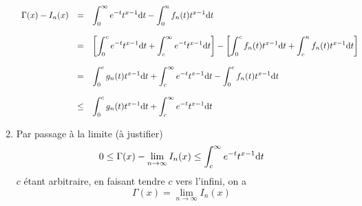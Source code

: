 \documentclass{article}
\def \de {{\rm d}}
\begin{document}
\begin{enumerate}
\[\begin{array}{rcl}
\Gamma(x) - I_n(x)&=&\displaystyle \int_0^\infty e^{-t}t^{x-1}\de t -\int_0^n f_n(t)t^{x-1}\de t\\  \\
&=&\displaystyle \left[ \int_0^c e^{-t}t^{x-1}\de t + \int_c^\infty e^{-t}t^{x-1}\de t\right] -\left[ \int_0^c f_n(t)t^{x-1}\de t +\int_c^n f_n(t)t^{x-1}\de t\right] \\  \\
&=&\displaystyle \int_0^c g_n(t)t^{x-1}\de t + \int_c^\infty e^{-t}t^{x-1}\de t -\int_0^c f_n(t)t^{x-1}\de t \\  \\
&\leq &\displaystyle \int_0^c g_n(t)t^{x-1}\de t + \int_c^\infty e^{-t}t^{x-1}\de t 
\end{array} \]

\item Par passage à la limite (à justifier)
\[0\leq \Gamma(x) - \lim_{n\to\infty}I_n(x)\leq \int_c^\infty e^{-t}t^{x-1}\de t \]
$c$ étant arbitraire, en faisant tendre $c$ vers l'infini, on a 
\[\Gamma(x) = \lim_{n\to\infty}I_n(x)\]
\end{enumerate}
\end{document}
